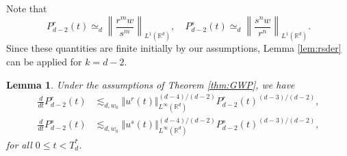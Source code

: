 \documentclass[11pt]{amsart}
\newcommand{\Green}[1]{\begingroup\color{green} #1\endgroup}
\newtheorem{lem}[theorem]{Lemma}
\theoremstyle{definition}
\theoremstyle{remark}
\numberwithin{equation}{section}
\numberwithin{equation}{section}
\newcommand{\nrm}[1]{\Vert#1\Vert}
\newcommand{\0}{\emptyset}
\newcommand{\ift}{\infty}
\newcommand{\bfv}{{\bf v}}
\newcommand{\bbR}{\mathbb R}
\begin{document}
Note that 
\begin{equation} 
P_{d-2}^{r}(t)\simeq_{d}\left\| \frac{r^{m}w}{s^{m}}\right\|_{L^{1}(\bbR^{d})},\quad P_{d-2}^{s}(t)\simeq_{d}\left\| \frac{s^{n}w}{r^{n}}\right\|_{L^{1}(\bbR^{d})}. 
\end{equation} 
Since these quantities are finite initially by our assumptions, Lemma \ref{lem:rsder} can be applied for $k=d-2$.
	\begin{lem}\label{lem:ddtPd-2}
	Under the assumptions of Theorem \ref{thm:GWP}, we have
		\begin{align}
			\frac{d}{dt}P_{d-2}^{r}(t)&\lesssim_{d,w_0} \nrm{u^{r}(t)}_{L^{\ift}(\bbR^{d})}^{(d-4)/(d-2)}P_{d-2}^{r}(t)^{(d-3)/(d-2)},\\
			\frac{d}{dt}P_{d-2}^{s}(t)&\lesssim_{d,w_0} \nrm{u^{s}(t)}_{L^{\ift}(\bbR^{d})}^{(d-4)/(d-2)}P_{d-2}^{s}(t)^{(d-3)/(d-2)},
		\end{align}
	for all $0\le t < T^{*}_d$.
	\end{lem}

	
\end{document}
